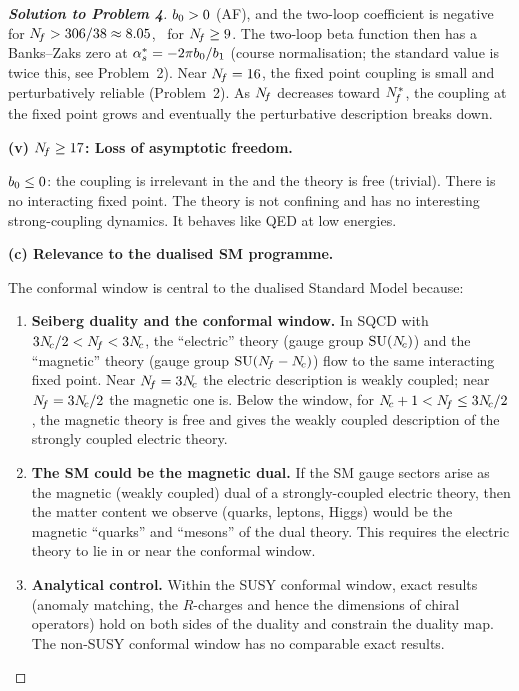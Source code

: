 \documentclass[11pt,a4paper]{article}
\begin{document}
\begin{proof}[\textbf{Solution to Problem 4}]
$b_0 > 0$ (AF), and the two-loop coefficient is negative for
$N_{\!f} > 306/38 \approx 8.05$, \ie\ for $N_{\!f} \geq 9$.  The two-loop beta
function then has a Banks--Zaks zero at $\alpha_s^* = -2\pi b_0/b_1$
(course normalisation; the standard value is twice this, see Problem~2).
Near $N_{\!f} = 16$, the fixed point coupling is small and perturbatively
reliable (Problem~2).  As $N_{\!f}$
decreases toward $N_{\!f}^*$, the coupling at the fixed point grows and
eventually the perturbative description breaks down.

\textbf{(v) $N_{\!f} \geq 17$: Loss of asymptotic freedom.}

$b_0 \leq 0$: the coupling is irrelevant in the \UV{} and the theory
is \IR{} free (trivial).  There is no interacting fixed point.  The theory
is not confining and has no interesting strong-coupling dynamics.  It
behaves like QED at low energies.

\medskip

\textbf{(c) Relevance to the dualised SM programme.}

The conformal window is central to the dualised Standard Model because:

\begin{enumerate}[label=\arabic*.]
  \item \textbf{Seiberg duality and the conformal window.}
    In SQCD with $3N_{\!c}/2 < N_{\!f} < 3N_{\!c}$, the ``electric'' theory (gauge
    group $\mathrm{SU}(N_{\!c})$) and the ``magnetic'' theory (gauge group
    $\mathrm{SU}(N_{\!f} - N_{\!c})$) flow to the same interacting fixed point.  Near
    $N_{\!f} = 3N_{\!c}$ the electric description is weakly coupled; near
    $N_{\!f} = 3N_{\!c}/2$ the magnetic one is.  Below the window, for
    $N_{\!c} + 1 < N_{\!f} \leq 3N_{\!c}/2$, the magnetic theory is \IR{} free and
    gives the weakly coupled description of the strongly coupled electric
    theory.

  \item \textbf{The SM could be the magnetic dual.}
    If the SM gauge sectors arise as the magnetic (weakly coupled) dual of
    a strongly-coupled electric theory, then the matter content we observe
    (quarks, leptons, Higgs) would be the magnetic ``quarks'' and ``mesons''
    of the dual theory.  This requires the electric theory to lie in or
    near the conformal window.

  \item \textbf{Analytical control.}  Within the SUSY conformal window,
    exact results (anomaly matching, the $R$-charges and hence the
    dimensions of chiral operators) hold on both sides of the duality and
    constrain the duality map.  The non-SUSY conformal window has no
    comparable exact results.
\end{enumerate}


\end{proof}
\end{document}
